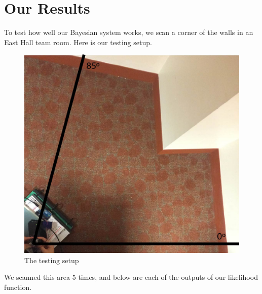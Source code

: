 \documentclass{article}
\begin{document}
\section{Our Results}
To test how well our Bayesian system works, we scan a corner of the walls in an East Hall team room. Here is our testing setup. \\

\begin{figure}[H]
\centering
\includegraphics[width=0.6\columnwidth]{corners.jpg}
\caption{The testing setup}
\label{fig:testing}
\end{figure}

We scanned this area 5 times, and below are each of the outputs of our likelihood function.\\
\end{document}
